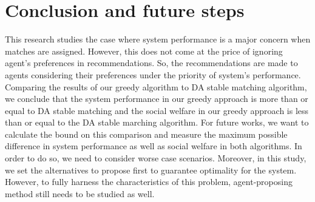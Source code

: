 \documentclass[11pt, letterpaper]{article}
\begin{document}

\section{Conclusion and future steps}
This research studies the case where system performance is a major concern when matches are assigned. However, this does not come at the price of ignoring agent's preferences in recommendations. So, the recommendations are made to agents considering their preferences under the priority of system's performance. Comparing the results of our greedy algorithm to DA stable matching algorithm, we conclude that the system performance in our greedy approach is more than or equal to DA stable matching and the social welfare in our greedy approach is less than or equal to the DA stable marching algorithm. 
For future works, we want to calculate the bound on this comparison and measure the maximum possible difference in system performance as well as social welfare in both algorithms. In order to do so, we need to consider worse case scenarios. 
Moreover, in this study, we set the alternatives to propose first to guarantee optimality for the system. However, to fully harness the characteristics of this problem, agent-proposing method still needs to be studied as well. 

\newpage
%
\setcounter{page}{1}

\end{document}
